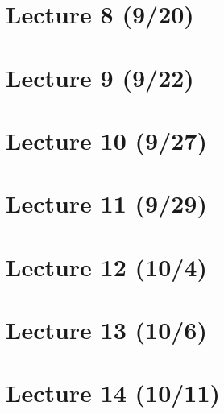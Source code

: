 \documentclass{book}
\theoremstyle{plain}
\begin{document}
    \chapter{Lecture 8 (9/20)}

    



    \chapter{Lecture 9 (9/22)}

    

    \chapter{Lecture 10 (9/27)}

    

    \chapter{Lecture 11 (9/29)}

    \chapter{Lecture 12 (10/4)}

    \chapter{Lecture 13 (10/6)}

    \chapter{Lecture 14 (10/11)}
\end{document}
